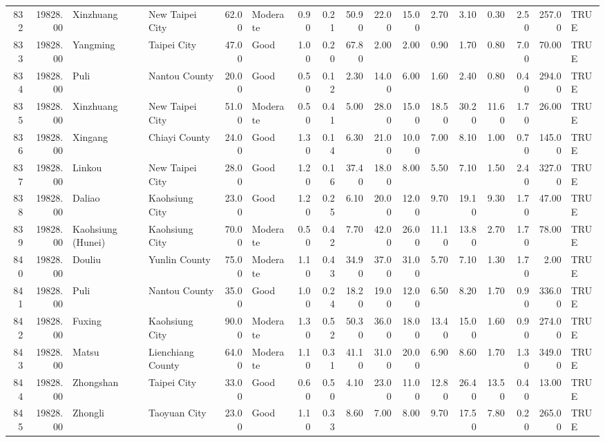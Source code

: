 \begin{table}[ht]
\begin{tabular}{rrllrlrrrrrrrrrrl}
  832 & 19828.00 & Xinzhuang & New Taipei City & 62.00 & Moderate & 0.90 & 0.21 & 50.90 & 22.00 & 15.00 & 2.70 & 3.10 & 0.30 & 2.50 & 257.00 & TRUE \\ 
  833 & 19828.00 & Yangming & Taipei City & 47.00 & Good & 1.00 & 0.20 & 67.80 & 2.00 & 2.00 & 0.90 & 1.70 & 0.80 & 7.00 & 70.00 & TRUE \\ 
  834 & 19828.00 & Puli & Nantou County & 20.00 & Good & 0.50 & 0.12 & 2.30 & 14.00 & 6.00 & 1.60 & 2.40 & 0.80 & 0.40 & 294.00 & TRUE \\ 
  835 & 19828.00 & Xinzhuang & New Taipei City & 51.00 & Moderate & 0.50 & 0.41 & 5.00 & 28.00 & 15.00 & 18.50 & 30.20 & 11.60 & 1.70 & 26.00 & TRUE \\ 
  836 & 19828.00 & Xingang & Chiayi County & 24.00 & Good & 1.30 & 0.14 & 6.30 & 21.00 & 10.00 & 7.00 & 8.10 & 1.00 & 0.70 & 145.00 & TRUE \\ 
  837 & 19828.00 & Linkou & New Taipei City & 28.00 & Good & 1.20 & 0.16 & 37.40 & 18.00 & 8.00 & 5.50 & 7.10 & 1.50 & 2.40 & 327.00 & TRUE \\ 
  838 & 19828.00 & Daliao & Kaohsiung City & 23.00 & Good & 1.20 & 0.25 & 6.10 & 20.00 & 12.00 & 9.70 & 19.10 & 9.30 & 1.70 & 47.00 & TRUE \\ 
  839 & 19828.00 & Kaohsiung (Hunei) & Kaohsiung City & 70.00 & Moderate & 0.50 & 0.42 & 7.70 & 42.00 & 26.00 & 11.10 & 13.80 & 2.70 & 1.70 & 78.00 & TRUE \\ 
  840 & 19828.00 & Douliu & Yunlin County & 75.00 & Moderate & 1.10 & 0.43 & 34.90 & 37.00 & 31.00 & 5.70 & 7.10 & 1.30 & 1.70 & 2.00 & TRUE \\ 
  841 & 19828.00 & Puli & Nantou County & 35.00 & Good & 1.00 & 0.24 & 18.20 & 19.00 & 12.00 & 6.50 & 8.20 & 1.70 & 0.90 & 336.00 & TRUE \\ 
  842 & 19828.00 & Fuxing & Kaohsiung City & 90.00 & Moderate & 1.30 & 0.52 & 50.30 & 36.00 & 18.00 & 13.40 & 15.00 & 1.60 & 0.90 & 274.00 & TRUE \\ 
  843 & 19828.00 & Matsu & Lienchiang County & 64.00 & Moderate & 1.10 & 0.31 & 41.10 & 31.00 & 20.00 & 6.90 & 8.60 & 1.70 & 1.30 & 349.00 & TRUE \\ 
  844 & 19828.00 & Zhongshan & Taipei City & 33.00 & Good & 0.60 & 0.50 & 4.10 & 23.00 & 11.00 & 12.80 & 26.40 & 13.50 & 0.40 & 13.00 & TRUE \\ 
  845 & 19828.00 & Zhongli & Taoyuan City & 23.00 & Good & 1.10 & 0.33 & 8.60 & 7.00 & 8.00 & 9.70 & 17.50 & 7.80 & 0.20 & 265.00 & TRUE \\ 

\end{tabular}
\end{table}
